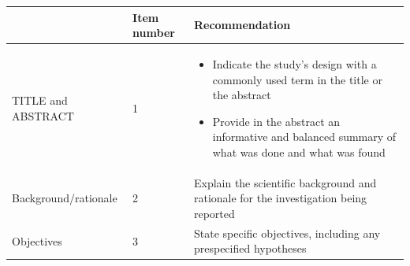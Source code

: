 \documentclass[]{book}
\providecommand{\tightlist}{%
  \setlength{\itemsep}{0pt}\setlength{\parskip}{0pt}}
\begin{document}
\begin{longtable}[]{@{}lll@{}}
\toprule
\begin{minipage}[b]{0.34\columnwidth}\raggedright
\strut
\end{minipage} & \begin{minipage}[b]{0.17\columnwidth}\raggedright
Item number\strut
\end{minipage} & \begin{minipage}[b]{0.40\columnwidth}\raggedright
Recommendation\strut
\end{minipage}\tabularnewline
\midrule
\endhead
\begin{minipage}[t]{0.34\columnwidth}\raggedright
TITLE and ABSTRACT\strut
\end{minipage} & \begin{minipage}[t]{0.17\columnwidth}\raggedright
1\strut
\end{minipage} & \begin{minipage}[t]{0.40\columnwidth}\raggedright
\begin{itemize}
\tightlist
\item
  Indicate the study's
  design with a commonly used
  term in the title or the
  abstract
\item
  Provide in the abstract an
  informative and balanced
  summary of what was done and
  what was found
\end{itemize}\strut
\end{minipage}\tabularnewline
\begin{minipage}[t]{0.34\columnwidth}\raggedright
Background/rationale\strut
\end{minipage} & \begin{minipage}[t]{0.17\columnwidth}\raggedright
2\strut
\end{minipage} & \begin{minipage}[t]{0.40\columnwidth}\raggedright
Explain the scientific
background and rationale for
the investigation being
reported\strut
\end{minipage}\tabularnewline
\begin{minipage}[t]{0.34\columnwidth}\raggedright
Objectives\strut
\end{minipage} & \begin{minipage}[t]{0.17\columnwidth}\raggedright
3\strut
\end{minipage} & \begin{minipage}[t]{0.40\columnwidth}\raggedright
State specific objectives,
including any prespecified
hypotheses\strut
\end{minipage}\tabularnewline

\end{longtable}
\end{document}
